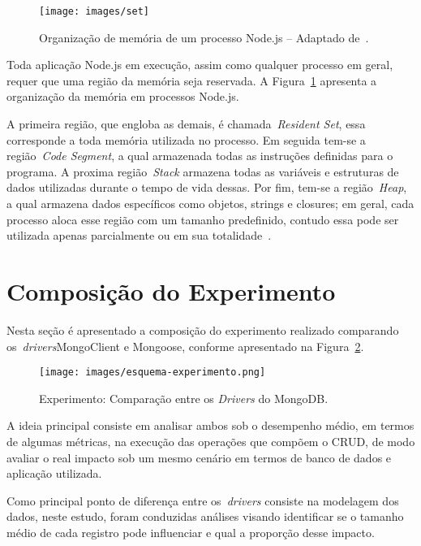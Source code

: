 \documentclass[12pt]{article}
\begin{document}
\begin{figure}[!h]
    \centering
    \texttt{[image: images/set]}
    \caption{Organização de memória de um processo Node.js -- Adaptado de~\cite{nodememory}.} %
    \label{figure:memoria}
\end{figure}

Toda aplicação Node.js em execução, assim como qualquer processo em geral, requer que uma região da memória seja reservada. A Figura~\ref{figure:memoria} apresenta a organização da memória em processos Node.js.

A primeira região, que engloba as demais, é chamada~\emph{Resident Set}, essa corresponde a toda memória utilizada no processo.  Em seguida tem-se a região~\emph{Code Segment}, a qual armazenada todas as instruções definidas para o programa.
A proxima região~\emph{Stack} armazena todas as variáveis e estruturas de dados utilizadas durante o tempo de vida dessas. Por fim, tem-se a região~\emph{Heap}, a qual armazena dados específicos como objetos, strings e closures; em geral, cada processo aloca esse região com um tamanho predefinido, contudo essa pode ser utilizada apenas parcialmente ou em sua totalidade~\cite{nodememory}. 

\section{Composição do Experimento}
\label{section:experimento}

Nesta seção é apresentado a composição do experimento realizado comparando os~\emph{drivers}MongoClient e Mongoose, conforme apresentado na Figura~\ref{figure:diagrama-banco}. 

\begin{figure}[ht]
    \centering
    \texttt{[image: images/esquema-experimento.png]}
    \caption{Experimento: Comparação entre os \emph{Drivers} do MongoDB.}
    \label{figure:diagrama-banco}
\end{figure}

A ideia principal consiste em analisar ambos sob o desempenho médio, em termos de algumas métricas, na execução das operações que compõem o CRUD, de modo avaliar o real impacto sob um mesmo cenário em termos de banco de dados e aplicação utilizada.

Como principal ponto de diferença entre os~\emph{drivers} consiste na modelagem dos dados, neste estudo, foram conduzidas análises visando identificar se o tamanho médio de cada registro pode influenciar e qual a proporção desse impacto.
\end{document}
